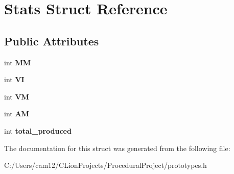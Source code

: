 \hypertarget{struct_stats}{}\section{Stats Struct Reference}
\label{struct_stats}
\subsection*{Public Attributes}
\begin{DoxyCompactItemize}
\item 
\mbox{\label{struct_stats_a9c63cf1c1896a7663558d11fdcec87f7}} 
int {\bfseries MM}
\item 
\mbox{\label{struct_stats_a93c5eeb2f263334727379d23399f15c1}} 
int {\bfseries VI}
\item 
\mbox{\label{struct_stats_ab7b3d418f9dc5a7dbba692d423f20db2}} 
int {\bfseries VM}
\item 
\mbox{\label{struct_stats_a735c7ca8643a419281833997490c9c17}} 
int {\bfseries AM}
\item 
\mbox{\label{struct_stats_a1fe2e9d0c7fc9832b3ef59f215d1ac26}} 
int {\bfseries total\+\_\+produced}
\end{DoxyCompactItemize}


The documentation for this struct was generated from the following file\+:\begin{DoxyCompactItemize}
\item 
C\+:/\+Users/cam12/\+C\+Lion\+Projects/\+Procedural\+Project/prototypes.\+h\end{DoxyCompactItemize}
